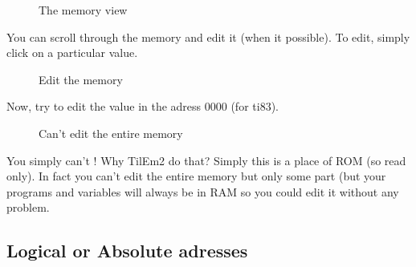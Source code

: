 \documentclass[10pt]{report}
\begin{document}
\begin{figure}[H]
\centering
{}
\caption{The memory view}
\end{figure}

You can scroll through the memory and edit it (when it possible).\newline
To edit, simply click on a particular value.\newline 
\begin{figure}[H]
\centering
{}
\caption{Edit the memory}
\end{figure}

Now, try to edit the value in the adress 0000 (for ti83).\newline

\begin{figure}[H]
\centering
{}
\caption{Can't edit the entire memory}
\end{figure}

You simply can't !\newline
Why TilEm2 do that?\newline
Simply this is a place of ROM (so read only).\newline
In fact you can't edit the entire memory but only some part (but your programs and variables will always be in RAM so you could edit it without any problem.\newline

\subsection{Logical or Absolute adresses}
\end{document}
